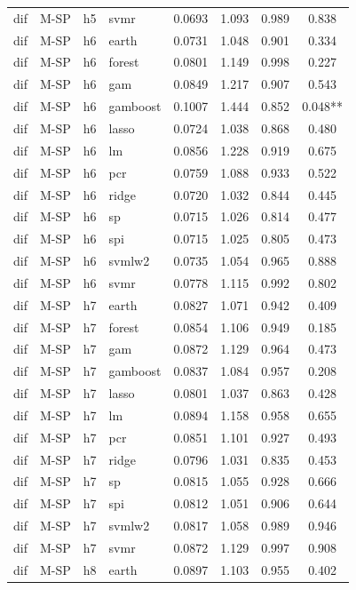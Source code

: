 \begin{ThreePartTable}
\begin{longtable}[t]{llclcccc}
dif & M-SP & h5 & svmr & 0.0693 & 1.093 & 0.989 & 0.838\\
\addlinespace
dif & M-SP & h6 & earth & 0.0731 & 1.048 & 0.901 & 0.334\\
dif & M-SP & h6 & forest & 0.0801 & 1.149 & 0.998 & 0.227\\
dif & M-SP & h6 & gam & 0.0849 & 1.217 & 0.907 & 0.543\\
dif & M-SP & h6 & gamboost & 0.1007 & 1.444 & 0.852 & 0.048**\\
dif & M-SP & h6 & lasso & 0.0724 & 1.038 & 0.868 & 0.480\\
dif & M-SP & h6 & lm & 0.0856 & 1.228 & 0.919 & 0.675\\
dif & M-SP & h6 & pcr & 0.0759 & 1.088 & 0.933 & 0.522\\
dif & M-SP & h6 & ridge & 0.0720 & 1.032 & 0.844 & 0.445\\
dif & M-SP & h6 & sp & 0.0715 & 1.026 & 0.814 & 0.477\\
dif & M-SP & h6 & spi & 0.0715 & 1.025 & 0.805 & 0.473\\
dif & M-SP & h6 & svmlw2 & 0.0735 & 1.054 & 0.965 & 0.888\\
dif & M-SP & h6 & svmr & 0.0778 & 1.115 & 0.992 & 0.802\\
\addlinespace
dif & M-SP & h7 & earth & 0.0827 & 1.071 & 0.942 & 0.409\\
dif & M-SP & h7 & forest & 0.0854 & 1.106 & 0.949 & 0.185\\
dif & M-SP & h7 & gam & 0.0872 & 1.129 & 0.964 & 0.473\\
dif & M-SP & h7 & gamboost & 0.0837 & 1.084 & 0.957 & 0.208\\
dif & M-SP & h7 & lasso & 0.0801 & 1.037 & 0.863 & 0.428\\
dif & M-SP & h7 & lm & 0.0894 & 1.158 & 0.958 & 0.655\\
dif & M-SP & h7 & pcr & 0.0851 & 1.101 & 0.927 & 0.493\\
dif & M-SP & h7 & ridge & 0.0796 & 1.031 & 0.835 & 0.453\\
dif & M-SP & h7 & sp & 0.0815 & 1.055 & 0.928 & 0.666\\
dif & M-SP & h7 & spi & 0.0812 & 1.051 & 0.906 & 0.644\\
dif & M-SP & h7 & svmlw2 & 0.0817 & 1.058 & 0.989 & 0.946\\
dif & M-SP & h7 & svmr & 0.0872 & 1.129 & 0.997 & 0.908\\
\addlinespace
dif & M-SP & h8 & earth & 0.0897 & 1.103 & 0.955 & 0.402\\

\end{longtable}
\end{ThreePartTable}
